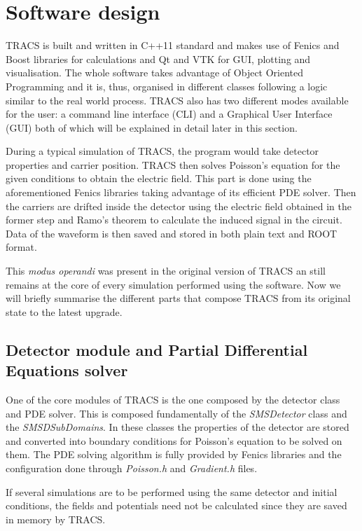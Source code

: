 \section{Software design} %
\label{sec:results_and_achievements}

TRACS is built and written in C++11 standard and makes use of Fenics and Boost libraries for calculations and Qt and VTK for GUI, plotting and visualisation. The whole software takes advantage of Object Oriented Programming and it is, thus, organised in different classes following a logic similar to the real world process. TRACS also has two different modes available for the user: a command line interface (CLI) and a Graphical User Interface (GUI) both of which will be explained in detail later in this section.

During a typical simulation of TRACS, the program would take detector properties and carrier position. TRACS then solves Poisson's equation for the given conditions to obtain the electric field. This part is done using the aforementioned Fenics libraries taking advantage of its efficient PDE solver. Then the carriers are drifted inside the detector using the electric field obtained in the former step and Ramo's theorem to calculate the induced signal in the circuit. Data of the waveform is then saved and stored in both plain text and ROOT format.

This \textit{modus operandi} was present in the original version of TRACS an still remains at the core of every simulation performed using the software. Now we will briefly summarise the different parts that compose TRACS from its original state to the latest upgrade.

\subsection{Detector module and Partial Differential Equations solver}

One of the core modules of TRACS is the one composed by the detector class and PDE solver. This is composed fundamentally of the \textit{SMSDetector} class and the \textit{SMSDSubDomains}. In these classes the properties of the detector are stored and converted into boundary conditions for Poisson's equation to be solved on them. The PDE solving algorithm is fully provided by Fenics libraries and the configuration done through \textit{Poisson.h} and \textit{Gradient.h} files.

If several simulations are to be performed using the same detector and initial conditions, the fields and potentials need not be calculated since they are saved in memory by TRACS. 

